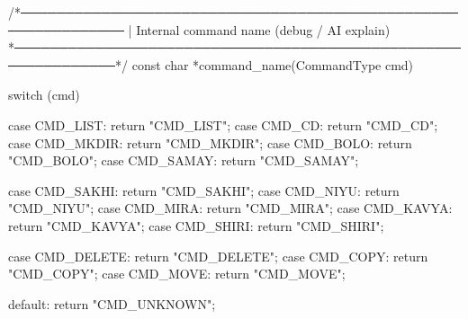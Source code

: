 \documentclass{article}
\begin{document}
/*──────────────────────────────────────────────────────────────
 | Internal command name (debug / AI explain)
 *──────────────────────────────────────────────────────────────*/
const char *command_name(CommandType cmd)
{
    switch (cmd) {
        case CMD_LIST:   return "CMD_LIST";
        case CMD_CD:     return "CMD_CD";
        case CMD_MKDIR:  return "CMD_MKDIR";
        case CMD_BOLO:   return "CMD_BOLO";
        case CMD_SAMAY:  return "CMD_SAMAY";

        case CMD_SAKHI:  return "CMD_SAKHI";
        case CMD_NIYU:   return "CMD_NIYU";
        case CMD_MIRA:   return "CMD_MIRA";
        case CMD_KAVYA:  return "CMD_KAVYA";
        case CMD_SHIRI:  return "CMD_SHIRI";

        case CMD_DELETE: return "CMD_DELETE";
        case CMD_COPY:   return "CMD_COPY";
        case CMD_MOVE:   return "CMD_MOVE";

        default:         return "CMD_UNKNOWN";
    }
}
\end{document}
